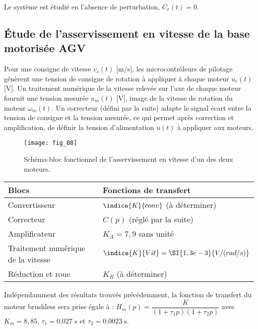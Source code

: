 Le système est étudié en l’absence de perturbation, $C_r(t) = 0$.




\subsection*{Étude de l’asservissement en vitesse de la base motorisée AGV}

Pour une consigne de vitesse $v_c(t)$ [m/s], les microcontrôleurs de pilotage génèrent une tension de
consigne de rotation à appliquer à chaque moteur $u_c(t)$ [V]. Un traitement numérique de la vitesse
relevée sur l’axe de chaque moteur fournit une tension mesurée $u_m(t)$ [V], image de la vitesse de
rotation du moteur $\omega_m(t)$. Un correcteur (défini par la suite) adapte le signal écart entre la tension de
consigne et la tension mesurée, ce qui permet après correction et amplification, de définir la tension
d’alimentation $u(t)$ à appliquer aux moteurs.

\begin{figure}[!h]
\centering
\texttt{[image: fig\_08]}
\caption{\label{fig:08}  Schéma-bloc fonctionnel de l’asservissement en vitesse d’un des deux moteurs.}
\end{figure}

\begin{table}[!h]
\centering
\begin{tabular}{ll}
\hline
\textbf{Blocs} & \textbf{Fonctions de transfert} \\
\hline
Convertisseur 		& $\indice{K}{conv}$  (à déterminer)\\
Correcteur		& $C(p)$ (réglé par la suite) \\
Amplificateur		& $K_A = 7,9$ sans unité \\
Traitement numérique de la vitesse 	& $\indice{K}{Vit} = \SI{1,3e-3}{V/(rad/s)}$ \\
Réduction et roue 	& $K_R$ (à déterminer) \\
\hline
\end{tabular}
\end{table}

Indépendamment des résultats trouvés précédemment, la fonction de transfert du moteur brushless
sera prise égale à : 
$H_m(p)=\dfrac{K}{\left(1+\tau_1 p \right)\left(1+\tau_2 p \right)}$ avec $K_m = 8,85$, 
$\tau_1 = \SI{0,027}{s}$ et $\tau_2 = \SI{0,0023}{s}$.



